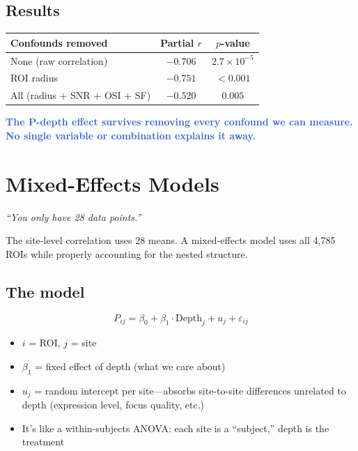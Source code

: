 \documentclass[11pt,letterpaper]{article}
\newcommand{\finding}[1]{\textcolor{highlight}{\textbf{#1}}}
\begin{document}
\subsection*{Results}
\begin{center}
\renewcommand{\arraystretch}{1.3}
\begin{tabular}{lcc}
\toprule
\textbf{Confounds removed} & \textbf{Partial $r$} & \textbf{$p$-value} \\
\midrule
None (raw correlation) & $-0.706$ & $2.7 \times 10^{-5}$ \\
ROI radius & $-0.751$ & $< 0.001$ \\
All (radius + SNR + OSI + SF) & $-0.520$ & $0.005$ \\
\bottomrule
\end{tabular}
\end{center}

\finding{The P-depth effect survives removing every confound we can
measure. No single variable or combination explains it away.}

\newpage
\section{Mixed-Effects Models}
\textcolor{muted}{\textit{``You only have 28 data points.''}}

The site-level correlation uses 28 means. A mixed-effects model uses all
4,785 ROIs while properly accounting for the nested structure.

\subsection*{The model}
$$P_{ij} = \beta_0 + \beta_1 \cdot \text{Depth}_j + u_j + \varepsilon_{ij}$$

\begin{itemize}[leftmargin=1.5em]
\item $i$ = ROI, $j$ = site
\item $\beta_1$ = fixed effect of depth (what we care about)
\item $u_j$ = random intercept per site---absorbs site-to-site differences
  unrelated to depth (expression level, focus quality, etc.)
\item It's like a within-subjects ANOVA: each site is a ``subject,'' depth
  is the treatment
\end{itemize}
\end{document}
